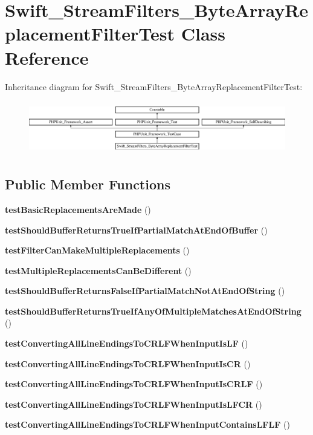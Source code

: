 \section{Swift\+\_\+\+Stream\+Filters\+\_\+\+Byte\+Array\+Replacement\+Filter\+Test Class Reference}
\label{class_swift___stream_filters___byte_array_replacement_filter_test}
Inheritance diagram for Swift\+\_\+\+Stream\+Filters\+\_\+\+Byte\+Array\+Replacement\+Filter\+Test\+:\begin{figure}[H]
\begin{center}
\leavevmode
\includegraphics[height=2.355415cm]{class_swift___stream_filters___byte_array_replacement_filter_test}
\end{center}
\end{figure}
\subsection*{Public Member Functions}
\begin{DoxyCompactItemize}
\item 
{\bf test\+Basic\+Replacements\+Are\+Made} ()
\item 
{\bf test\+Should\+Buffer\+Returns\+True\+If\+Partial\+Match\+At\+End\+Of\+Buffer} ()
\item 
{\bf test\+Filter\+Can\+Make\+Multiple\+Replacements} ()
\item 
{\bf test\+Multiple\+Replacements\+Can\+Be\+Different} ()
\item 
{\bf test\+Should\+Buffer\+Returns\+False\+If\+Partial\+Match\+Not\+At\+End\+Of\+String} ()
\item 
{\bf test\+Should\+Buffer\+Returns\+True\+If\+Any\+Of\+Multiple\+Matches\+At\+End\+Of\+String} ()
\item 
{\bf test\+Converting\+All\+Line\+Endings\+To\+C\+R\+L\+F\+When\+Input\+Is\+L\+F} ()
\item 
{\bf test\+Converting\+All\+Line\+Endings\+To\+C\+R\+L\+F\+When\+Input\+Is\+C\+R} ()
\item 
{\bf test\+Converting\+All\+Line\+Endings\+To\+C\+R\+L\+F\+When\+Input\+Is\+C\+R\+L\+F} ()
\item 
{\bf test\+Converting\+All\+Line\+Endings\+To\+C\+R\+L\+F\+When\+Input\+Is\+L\+F\+C\+R} ()
\item 
{\bf test\+Converting\+All\+Line\+Endings\+To\+C\+R\+L\+F\+When\+Input\+Contains\+L\+F\+L\+F} ()
\end{DoxyCompactItemize}
